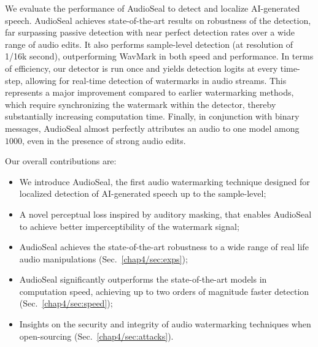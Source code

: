 We evaluate the performance of AudioSeal to detect and localize AI-generated speech.
AudioSeal achieves state-of-the-art results on robustness of the detection, far surpassing passive detection with near perfect detection rates over a wide range of audio edits.
It also performs sample-level detection (at resolution of 1/16k second), outperforming WavMark in both speed and performance.
In terms of efficiency, our detector is run once and yields detection logits at every time-step, allowing for real-time detection of watermarks in audio streams. 
This represents a major improvement compared to earlier watermarking methods, which require synchronizing the watermark within the detector, thereby substantially increasing computation time.
Finally, in conjunction with binary messages, AudioSeal almost perfectly attributes an audio to one model among $1000$, even in the presence of strong audio edits.

Our overall contributions are:
\begin{itemize}
    \item We introduce AudioSeal, the first audio watermarking technique designed for localized detection of AI-generated speech up to the sample-level;
    \item A novel perceptual loss inspired by auditory masking, that enables AudioSeal to achieve better imperceptibility of the watermark signal;  
    \item AudioSeal achieves the state-of-the-art robustness to a wide range of real life audio manipulations (Sec.~\ref{chap4/sec:exps});
    \item AudioSeal significantly outperforms the state-of-the-art models in computation speed, achieving up to two orders of magnitude faster detection (Sec.~\ref{chap4/sec:speed});
    \item Insights on the security and integrity of audio watermarking techniques when open-sourcing (Sec.~\ref{chap4/sec:attacks}).
\end{itemize}
